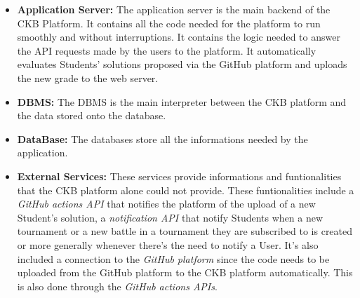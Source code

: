 \documentclass{article}
\begin{document}
{\begin{itemize}
        It is the main container for the JavaScript and general backend code for the platform.
        The Web server is connected to the Application server because it needs to be automatically updated when new grades for Students' solutions are generated
        by the platform.\\
        \item \textbf{Application Server:} The application server is the main backend of the CKB Platform. 
        It contains all the code needed for the platform to run smoothly and without interruptions. 
        It contains the logic needed to answer the API requests made by the users to the platform. It
        automatically evaluates Students' solutions proposed via the GitHub platform and uploads the 
        new grade to the web server.\\
        \item \textbf{DBMS:} The DBMS is the main interpreter between the CKB platform and the data 
        stored onto the database.\\
        \item \textbf{DataBase:} The databases store all the informations needed by the application.\\
        \item \textbf{External Services:} These services provide informations and funtionalities that 
        the CKB platform alone could not provide.
        These funtionalities include a \textit{GitHub actions API} that notifies the platform of the 
        upload of a new Student's solution, a \textit{notification API} that notify Students when a new 
        tournament or a new battle in a tournament they are subscribed to is created or more generally
        whenever there's the need to notify a User. It's also included a connection to the 
        \textit{GitHub platform} since the code needs to be uploaded from the GitHub platform to the 
        CKB platform automatically. This is also done through the \textit{GitHub actions APIs}.
    \end{itemize}
}
\end{document}
